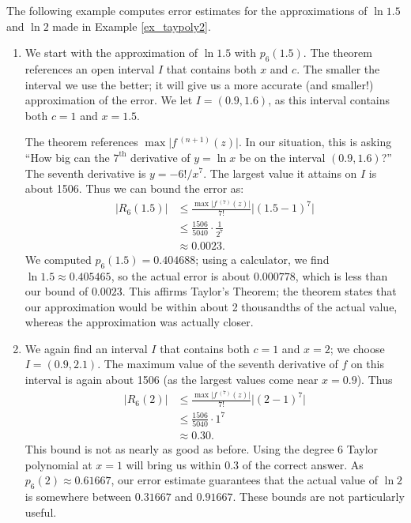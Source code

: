 The following example computes error estimates for the approximations of $\ln 1.5$ and $\ln 2$ made in Example \ref{ex_taypoly2}.\\

{\begin{enumerate}
\item	We start with the approximation of $\ln 1.5$ with $p_6(1.5)$. The theorem references an open interval $I$ that contains both $x$ and $c$. The smaller the interval we use the better; it will give us a more accurate (and smaller!) approximation of the error. We let $I = (0.9,1.6)$, as this interval contains both $c=1$ and $x=1.5$. 

The theorem references $\max\big\lvert f\,^{(n+1)}(z)\big\rvert$. In our situation, this is asking ``How big can the $7^\text{th}$ derivative of $y=\ln x$ be on the interval $(0.9,1.6)$?'' The seventh derivative is $y = -6!/x^7$. The largest value it attains on $I$ is about 1506. Thus we can bound the error as:
\begin{align*}
\big\lvert R_6(1.5)\big\rvert &\leq \frac{\max\big\lvert f\,^{(7)}(z)\big\rvert}{7!}\big\lvert (1.5-1)^7\big\rvert\\
					&\leq \frac{1506}{5040}\cdot\frac1{2^7}\\
					&\approx 0.0023.
\end{align*}
\noindent%
We computed $p_6(1.5) = 0.404688$; using a calculator, we find $\ln 1.5 \approx 0.405465$, so the actual error is about $0.000778$, which is less than our bound of $0.0023$. This affirms Taylor's Theorem; the theorem states that our approximation would be within about 2 thousandths of the actual value, whereas the approximation was actually closer.

\item		We again find an interval $I$ that contains both $c=1$ and $x=2$; we choose $I = (0.9,2.1)$. The maximum value of the seventh derivative of $f$ on this interval is again about 1506 (as the largest values come near $x=0.9$). Thus 
\begin{align*}
\big\lvert R_6(2)\big\rvert &\leq \frac{\max\big\lvert f\,^{(7)}(z)\big\rvert}{7!}\big\lvert(2-1)^7\big\rvert\\
					&\leq \frac{1506}{5040}\cdot1^7\\
					&\approx 0.30.
\end{align*}
This bound is not as nearly as good as before. Using the degree 6 Taylor polynomial at $x =1$ will bring us within 0.3 of the correct answer. As $p_6(2)\approx 0.61667$, our error estimate guarantees that the actual value of $\ln 2$ is somewhere between $0.31667$ and $0.91667$. These bounds are not particularly useful.


\end{enumerate}}
